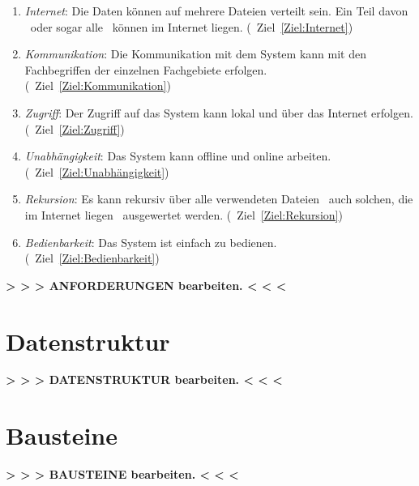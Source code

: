 \documentclass[english,ngerman,parskip=half,headsepline,footsepline]{scrreprt}
\begin{document}
\begin{enumerate}
		\item \label{Anforderung:Internet} \emph{Internet}: Die Daten können auf mehrere Dateien verteilt sein. Ein Teil davon \textendash\ oder sogar alle \textendash\ können im Internet liegen. (\seename\ Ziel~\vref{Ziel:Internet})

		\item \label{Anforderung:Kommunikation} \emph{Kommunikation}: Die Kommunikation mit dem System kann mit den Fachbegriffen der einzelnen Fachgebiete erfolgen. (\seename\ Ziel~\vref{Ziel:Kommunikation})

		\item \label{Anforderung:Zugriff} \emph{Zugriff}: Der Zugriff auf das System kann lokal und über das Internet erfolgen. (\seename\ Ziel~\vref{Ziel:Zugriff})

		\item \label{Anforderung:Unabhängigkeit} \emph{Unabhängigkeit}: Das System kann offline und online arbeiten. (\seename\ Ziel~\vref{Ziel:Unabhängigkeit})

		\item \label{Anforderung:Rekursion} \emph{Rekursion}: Es kann rekursiv über alle verwendeten Dateien \textendash\ auch solchen, die im Internet liegen \textendash\ ausgewertet werden. (\seename\ Ziel~\vref{Ziel:Rekursion})

		\item \label{Anforderung:Bedienbarkeit} \emph{Bedienbarkeit}: Das System ist einfach zu bedienen. (\seename\ Ziel~\vref{Ziel:Bedienbarkeit})

	\end{enumerate}

	\par \textbf{> > > ANFORDERUNGEN bearbeiten. < < <} %

	\section{Datenstruktur}
	\label{Datenstruktur}

	\par \textbf{> > > DATENSTRUKTUR bearbeiten. < < <} %

	\section{Bausteine}
	\label{Bausteine}

	\par \textbf{> > > BAUSTEINE bearbeiten. < < <} %
\end{document}
